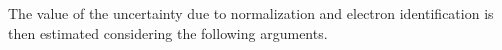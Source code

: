 






The value of the uncertainty due to normalization and electron identification is then estimated considering the following arguments.

